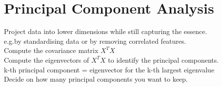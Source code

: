\section{Principal Component Analysis}
Project data into lower dimensions while still capturing the essence.\\ e.g.by
standardising data or by removing correlated features.\\ Compute the covariance
matrix $X^{T}X$\\ Compute the eigenvectors of $X^{T}X$ to identify the principal
components.\\ k-th principal component = eigenvector for the k-th largest eigenvalue\\
Decide on how many principal components you want to keep.